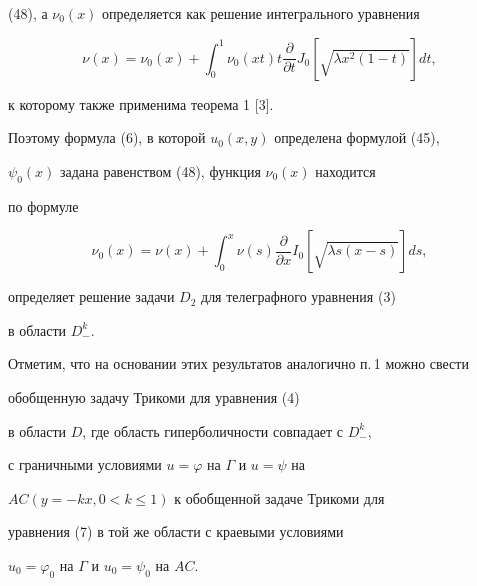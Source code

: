 (48), а $\nu_0(x)$ определяется как решение интегрального уравнения


$$


\nu (x)=\nu_0(x)+\int_0^1 \nu_0(xt)t\frac {\partial }


{\partial t}J_0[\sqrt {\lambda x^2(1-t)}]dt,


$$


к которому также применима теорема 1 [3].





Поэтому формула (6), в которой $u_0(x,y)$ определена формулой (45),


$\psi_0(x)$ задана равенством (48), функция $\nu_0(x)$ находится


по формуле


$$


\nu_0(x)=\nu (x)+\int_0^x \nu(s)\frac {\partial }


{\partial x}I_0[\sqrt {\lambda s(x-s)}]ds,


$$


определяет решение задачи $D_2$ для телеграфного уравнения (3)


в области $D_-^k$.





Отметим, что на основании этих результатов аналогично п.\,1 можно свести


обобщенную задачу Трикоми для уравнения (4) 


в области $D$, где область гиперболичности совпадает с $D_-^k$,


с граничными условиями $u=\varphi $ на $\Gamma$ и $u=\psi $ на 


$AC(y=-kx,0<k\le 1)$ к обобщенной задаче Трикоми для


уравнения (7) в той же области с краевыми условиями 


$u_0=\varphi_0$ на $\Gamma$ и $u_0=\psi_0$ на $AC$.





